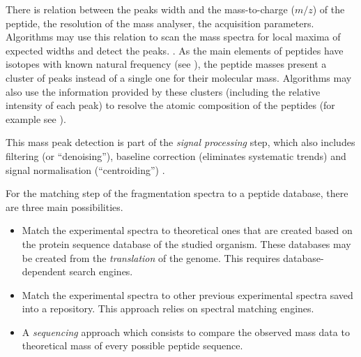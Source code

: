 There is relation between the peaks width and the mass-to-charge ($m/z$) of
the peptide, the resolution of the mass analyser, the acquisition parameters.
Algorithms may use this relation to scan the mass spectra for local maxima of
expected widths and detect the peaks. .
As the main elements of peptides have isotopes with known natural frequency
(see ), the peptide masses present a cluster of peaks instead
of a single one for their molecular mass. Algorithms may also use the information
provided by these clusters (including the relative intensity of each peak) to
resolve the atomic composition of the peptides (for example see ).

This mass peak detection is part of the \emph{signal processing} step, which also
includes filtering (or \enquote{denoising}), baseline correction (eliminates
systematic trends) and signal normalisation (\enquote{centroiding})
.


For the matching step of the fragmentation spectra to a peptide database,
there are three main possibilities.
\begin{itemize}
    \item Match the experimental spectra to theoretical ones that are created
         based on the protein sequence database of the studied
        organism. These databases may be created from the \emph{
        translation} of the genome. This requires database-dependent search engines.
    \item Match the experimental spectra to other previous experimental spectra
        saved into a repository. This approach relies on spectral matching engines.
    \item A  \emph{sequencing} approach which consists to compare
        the observed mass data to theoretical mass of every possible peptide
        sequence.
\end{itemize}

\label{seg:moreAlgoisbetter}


